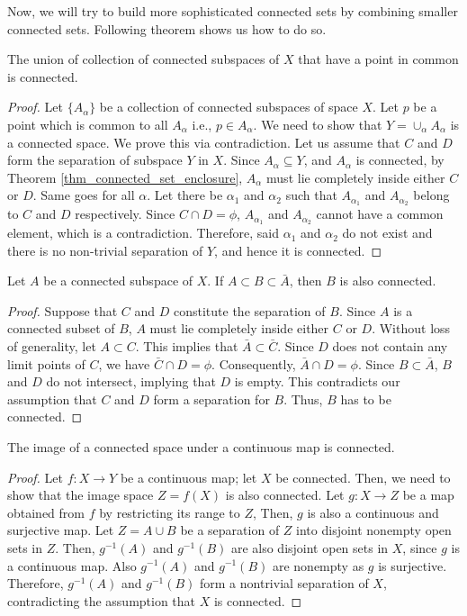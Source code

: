\documentclass[a4paper,english,12pt]{article}
\begin{document}
Now, we will try to build more sophisticated connected sets by combining smaller connected sets. Following theorem shows us how to do so.

\begin{thm} \label{thm_union_preserves_connectedness}
 The union of collection of connected subspaces of $X$ that have a point in common is connected.
\end{thm}
\begin{proof}
Let $\{A_{\alpha}\}$ be a collection of connected subspaces of space $X$. Let $p$ be a point which is common to 
all $A_{\alpha}$ i.e., $p \in A_{\alpha}$. We need to show that $Y = \cup_{\alpha}A_{\alpha}$ is a connected space.
We prove this via contradiction. Let us assume that $C$ and $D$ form the separation of subspace $Y$ in $X$. Since 
$A_{\alpha} \subseteq Y$, and $A_{\alpha}$ is connected, by Theorem \ref{thm_connected_set_enclosure}, $A_{\alpha}$ must lie completely
inside either $C$ or $D$. Same goes for all $\alpha$. Let there be $\alpha_{1}$ and $\alpha_{2}$ such that $A_{\alpha_{1}}$ and $A_{\alpha_{2}}$
belong to $C$ and $D$ respectively. Since $C \cap D = \phi$, $A_{\alpha_{1}}$ and $A_{\alpha_{2}}$ cannot have a common element, which is 
a contradiction. Therefore, said $\alpha_{1}$ and $\alpha_{2}$ do not exist and there is no non-trivial separation of $Y$, and hence it is connected.  
\end{proof}


\begin{thm}
Let $A$ be a connected subspace of $X$. If $A \subset B \subset \bar{A}$, then $B$ is also connected.
\end{thm}
\begin{proof}
Suppose that $C$ and $D$ constitute the separation of $B$. Since $A$ is a connected subset of $B$, $A$ must lie completely inside either $C$
or $D$. Without loss of generality, let $A \subset C$. This implies that $\bar{A} \subset \bar{C}$. Since $D$ does not contain any limit points of 
$C$, we have $\bar{C} \cap D = \phi$. Consequently, $\bar{A} \cap D = \phi$. Since $B \subset \bar{A}$, $B$ and $D$ do not intersect, implying 
that $D$ is empty. This contradicts our assumption that $C$ and $D$ form a separation for $B$. Thus, $B$ has to be connected. 
\end{proof}


\begin{thm}
The image of a connected space under a continuous map is connected.
\end{thm}
\begin{proof}
Let $f: X \to Y$ be a continuous map; let $X$ be connected. Then, we need to show that the image space $Z = f(X)$ is also connected.
Let $g: X \to Z$ be a map obtained from $f$ by restricting its range to $Z$, Then, $g$ is also a continuous and surjective map. Let $Z = A \cup B$ 
be a separation of $Z$ into disjoint nonempty open sets in $Z$. Then, $g^{-1}(A)$ and $g^{-1}(B)$ are also disjoint open sets in $X$, 
since $g$ is a continuous map. Also $g^{-1}(A)$ and $g^{-1}(B)$ are nonempty as $g$ is surjective. Therefore, $g^{-1}(A)$ and $g^{-1}(B)$
form a nontrivial separation of $X$, contradicting the assumption that $X$ is connected.
\end{proof}
\end{document}

